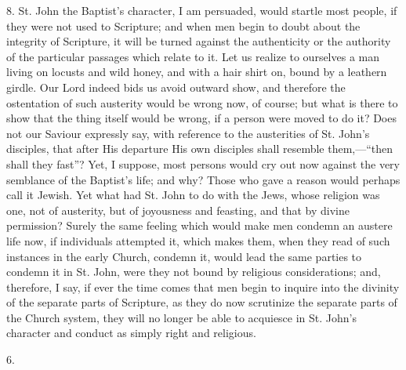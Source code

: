 8. St. John the Baptist's character, I am persuaded, would startle
most people, if they were not used to Scripture; and when men begin to
doubt about the integrity of Scripture, it will be turned against the
authenticity or the authority of the particular passages which relate to it. Let us realize to ourselves a man living on locusts and
wild honey, and with a hair shirt on, bound by a leathern girdle. Our
Lord indeed bids us avoid outward show, and therefore the ostentation
of such austerity would be wrong now, of course; but what is there to
show that the thing itself would be wrong, if a person were moved to
do it? Does not our Saviour expressly say, with reference to the
austerities of St. John's disciples, that after His departure His own
disciples shall resemble them,—``then shall they fast''?
Yet, I suppose, most persons would cry out now against the very
semblance of the Baptist's life; and why? Those who gave a reason
would perhaps call it Jewish. Yet what had St. John to do with the
Jews, whose religion was one, not of austerity, but of joyousness and
feasting, and that by divine permission? Surely the same feeling which
would make men condemn an austere life now, if individuals attempted
it, which makes them, when they read of such instances in the early
Church, condemn it, would lead the same parties to condemn it in St.
John, were they not bound by religious considerations; and, therefore,
I say, if ever the time comes that men begin to inquire into the
divinity of the separate parts of Scripture, as they do now scrutinize
the separate parts of the Church system, they will no longer be able
to acquiesce in St. John's character and conduct as simply right and
religious.

6.

